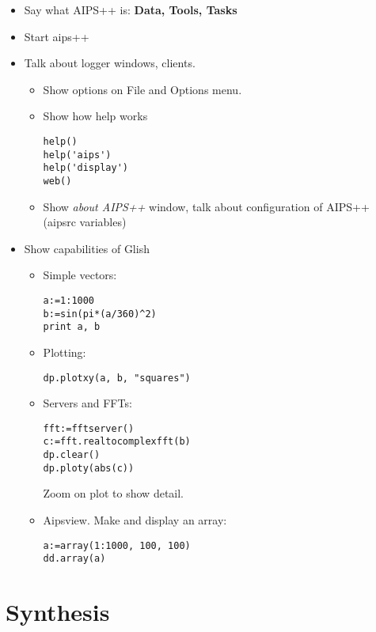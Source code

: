 \begin{itemize}
\item Say what AIPS++ is: {\bf Data, Tools, Tasks}
\item Start aips++
\item Talk about logger windows, clients. 
\begin{itemize}
\item Show options on File and Options menu. 
\item Show how help works
\begin{verbatim}
help()
help('aips')
help('display')
web()
\end{verbatim}
\item Show {\em about AIPS++} window, talk about configuration of
AIPS++ (aipsrc variables)
\end{itemize}
\item Show capabilities of Glish
\begin{itemize}
\item Simple vectors: 
\begin{verbatim}
a:=1:1000
b:=sin(pi*(a/360)^2)
print a, b
\end{verbatim}
\item Plotting: 
\begin{verbatim}
dp.plotxy(a, b, "squares")
\end{verbatim}
\item Servers and FFTs:
\begin{verbatim}
fft:=fftserver()
c:=fft.realtocomplexfft(b)
dp.clear()
dp.ploty(abs(c))
\end{verbatim}
Zoom on plot to show detail.
\item Aipsview. Make and display an array:
\begin{verbatim}
a:=array(1:1000, 100, 100)
dd.array(a)
\end{verbatim}
\end{itemize}
\end{itemize}

\section{Synthesis}

